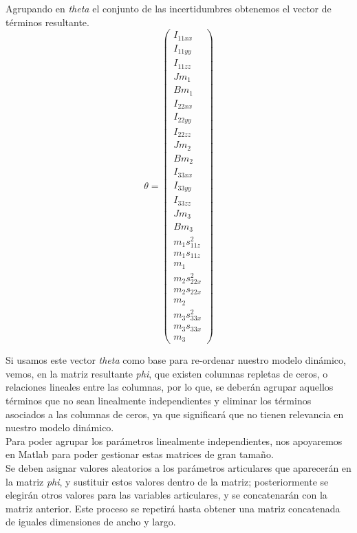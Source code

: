 	Agrupando en \textit{theta} el conjunto de las incertidumbres obtenemos el vector de términos resultante.
	\begin{equation}
		\theta=
			\begin{pmatrix}
				I_{11xx} \\
				I_{11yy}\\
				I_{11zz}\\
				Jm_{1} \\
				Bm_{1} \\
				I_{22xx} \\
				I_{22yy}\\
				I_{22zz}\\
				Jm_{2} \\
				Bm_{2} \\
				I_{33xx} \\
				I_{33yy}\\
				I_{33zz}\\
				Jm_{3} \\
				Bm_{3} \\
				m_{1}s_{11z}^{2} \\
				m_{1}s_{11z} \\
				m_{1}\\
				m_{2}s_{22x}^{2} \\
				m_{2}s_{22x} \\
				m_{2}\\
				m_{3}s_{33x}^{2} \\
				m_{3}s_{33x} \\
				m_{3}
				\end{pmatrix}
		\end{equation}

		Si usamos este vector \textit{theta} como base para re-ordenar nuestro modelo dinámico, vemos, en la matriz resultante \textit{phi},
		que existen columnas repletas de ceros, o relaciones lineales entre las columnas, por lo que, se deberán
		agrupar aquellos términos que no sean linealmente independientes y eliminar los términos asociados
		a las columnas de ceros, ya que significará que no tienen relevancia en nuestro modelo dinámico.\\

		Para poder agrupar los parámetros linealmente independientes, nos apoyaremos en Matlab para poder gestionar
		estas matrices de gran tamaño.\\
		Se deben asignar valores aleatorios a los parámetros articulares que aparecerán en la matriz \textit{phi}, y sustituir estos
		valores dentro de la matriz; posteriormente se elegirán otros valores para las variables articulares,  y se concatenarán
		con la matriz anterior. Este proceso se repetirá hasta obtener una matriz concatenada de iguales dimensiones de ancho y largo.\\

